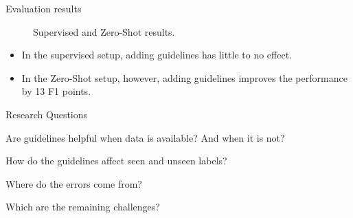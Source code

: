 \documentclass[
    11pt,
    notheorems,
    xcolor={dvipsnames},
    hyperref={
        pdfstartview=FitH, 
        pdftitle={Ikasketa-adibide urriko Informazio-Erauzketa}, 
        pdfauthor={Oscar Sainz Jimenez}, 
        citecolor=secondary, 
    }
]{beamer}
\begin{document}
\begin{frame}
    \begin{block}{Evaluation results}
        \begin{figure}
            \centering
            \resizebox{.6\textwidth}{!}{
                
            }
            \caption{Supervised and Zero-Shot results.}
        \end{figure}

        \begin{itemize}
            \item In the supervised setup, adding guidelines has little to no effect.
            \item In the Zero-Shot setup, however, adding guidelines improves the performance by 13 F1 points.
        \end{itemize}
    \end{block}
\end{frame}






\begin{frame}
    \begin{block}{Research Questions}
        \begin{itemize}
            {
                \item Are guidelines helpful when data is available? And when it is not?
            }
            {
                \item How do the guidelines affect seen and unseen labels?
            }
            {
                \item Where do the errors come from?
                \item Which are the remaining challenges?
            }
        \end{itemize}
    \end{block}
\end{frame}
\end{document}
